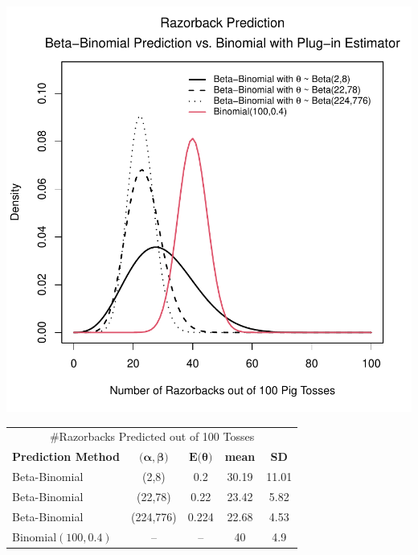 \documentclass[12pt, a4paper]{article}
\begin{document}
\vspace{1cm}

\includegraphics{Thesis_v3-002}

\vspace{1cm}

\begin{center}
  \begin{tabular}{l c c c c }
  \toprule
  \multicolumn{5}{c}{\large \#Razorbacks Predicted out of 100 Tosses}          \\
  \multicolumn{1}{c}{\textbf{Prediction Method}} & \multicolumn{1}{c}{$\textbf{(}\boldsymbol\alpha,\boldsymbol\beta\textbf{)}$}  & \multicolumn{1}{c}{$\textbf{E(}\boldsymbol\theta\textbf{)}$}  & \multicolumn{1}{c}{\textbf{mean}} & \multicolumn{1}{c}{\textbf{SD}}\\
        \midrule
        Beta-Binomial & (2,8) & 0.2 & 30.19 & 11.01 \\
        \midrule
        Beta-Binomial & (22,78) & 0.22 & 23.42 & 5.82\\
        \midrule
        Beta-Binomial & (224,776) & 0.224 & 22.68 & 4.53 \\
        \midrule
        Binomial$(100,0.4)$ & -- & -- & 40 & 4.9 \\
  \bottomrule
  \end{tabular}
\end{center}
\end{document}
